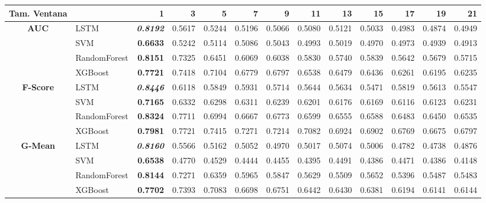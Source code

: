 \begin{table}[H]
	\centering
	\begin{adjustbox}{max width=12cm}
		\begin{tabular}{|c|l|r|r|r|r|r|r|r|r|r|r|r|}
			\hline
			\textbf{Tam. Ventana}&         &      1  &      3  &      5  &      7  &      9  &      11 &      13 &      15 &      17 &      19 &      21 \\
			\hline
			\textbf{AUC} &  LSTM & \textit{ \textbf{  0.8192 } } &  0.5617 &  0.5244 &  0.5196 &  0.5066 &  0.5080 &  0.5121 &  0.5033 &  0.4983 &  0.4874 &  0.4949 \\
			&  SVM & \textbf{  0.6633 } &  0.5242 &  0.5114 &  0.5086 &  0.5043 &  0.4993 &  0.5019 &  0.4970 &  0.4973 &  0.4939 &  0.4913 \\
			&  RandomForest & \textbf{  0.8151 } &  0.7325 &  0.6451 &  0.6069 &  0.6038 &  0.5830 &  0.5740 &  0.5839 &  0.5642 &  0.5679 &  0.5715 \\
			&  XGBoost & \textbf{  0.7721 } &  0.7418 &  0.7104 &  0.6779 &  0.6797 &  0.6538 &  0.6479 &  0.6436 &  0.6261 &  0.6195 &  0.6235 \\
			\hline
			\textbf{F-Score} &  LSTM & \textit{ \textbf{  0.8446 } } &  0.6118 &  0.5849 &  0.5931 &  0.5714 &  0.5644 &  0.5634 &  0.5471 &  0.5819 &  0.5613 &  0.5547 \\
			&  SVM & \textbf{  0.7165 } &  0.6332 &  0.6298 &  0.6311 &  0.6239 &  0.6201 &  0.6176 &  0.6169 &  0.6116 &  0.6123 &  0.6231 \\
			&  RandomForest & \textbf{  0.8324 } &  0.7711 &  0.6994 &  0.6667 &  0.6773 &  0.6599 &  0.6555 &  0.6588 &  0.6483 &  0.6450 &  0.6535 \\
			&  XGBoost & \textbf{  0.7981 } &  0.7721 &  0.7415 &  0.7271 &  0.7214 &  0.7082 &  0.6924 &  0.6902 &  0.6769 &  0.6675 &  0.6797 \\
			\hline
			\textbf{G-Mean} &  LSTM & \textit{ \textbf{  0.8160 } } &  0.5566 &  0.5162 &  0.5052 &  0.4970 &  0.5017 &  0.5074 &  0.5006 &  0.4782 &  0.4738 &  0.4876 \\
			&  SVM & \textbf{  0.6538 } &  0.4770 &  0.4529 &  0.4444 &  0.4455 &  0.4395 &  0.4491 &  0.4386 &  0.4471 &  0.4386 &  0.4148 \\
			&  RandomForest & \textbf{  0.8144 } &  0.7271 &  0.6359 &  0.5965 &  0.5847 &  0.5629 &  0.5509 &  0.5652 &  0.5396 &  0.5487 &  0.5483 \\
			&  XGBoost & \textbf{  0.7702 } &  0.7393 &  0.7083 &  0.6698 &  0.6751 &  0.6442 &  0.6430 &  0.6381 &  0.6194 &  0.6141 &  0.6144 \\

\end{tabular}
\end{adjustbox}
\end{table}
